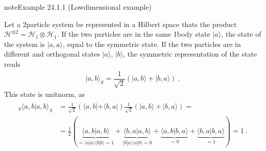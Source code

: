 \documentclass[letterpaper,10pt,english]{jupyterBook}
\begin{document}
\begin{sphinxadmonition}{note}{Example 24.1.1 (Low\sphinxhyphen{}dimensional example)}



\sphinxAtStartPar
Let a 2\sphinxhyphen{}particle system be represented in a Hilbert space thats the product \(\mathcal{H}^{\otimes 2} = \mathcal{H}_1 \otimes \mathcal{H}_1\). If the two particles are in the same 1\sphinxhyphen{}body state \(| a \rangle\), the state of the system is \(| a , a \rangle\), equal to the symmetric state. If the two particles are in different and orthogonal states \(| a \rangle\), \(| b \rangle\), the symmetric representation of the state reads
\begin{equation*}
\begin{split}| a, b \rangle_S = \dfrac{1}{\sqrt{2}} \left( | a , b \rangle + | b , a \rangle \right) \ .\end{split}
\end{equation*}
\sphinxAtStartPar
This state is unit\sphinxhyphen{}norm, as
\begin{equation*}
\begin{split}\begin{aligned}
  {}_S \langle a , b | a, b \rangle_S 
  & = \frac{1}{\sqrt{2}} \left( \langle a , b | + \langle b , a | \right) \frac{1}{\sqrt{2}} \left( | a , b \rangle + | b , a \rangle  \right) = \\
  & = \frac{1}{2} \left( \underbrace{\langle a , b | a, b \rangle}_{=\langle a | a \rangle \langle b |b \rangle = 1} + \underbrace{\langle b , a | a, b \rangle}_{\langle b | a \rangle \langle a | b \rangle = 0} + \underbrace{\langle a , b | b, a \rangle}_{=0} + \underbrace{\langle b , a | b, a \rangle}_{=1} \right) = 1 \ .
\end{aligned}\end{split}
\end{equation*}\end{sphinxadmonition}
\end{document}
